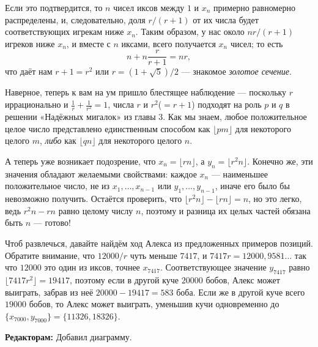 Если это подтвердится, то $n$ чисел иксов между $1$ и $x_n$ примерно равномерно распределены, и, следовательно, доля $r/(r + 1)$ от их числа будет соответствующих игрекам ниже $x_n$.
Таким образом, у нас около $nr/(r + 1)$ игреков ниже $x_n$, и вместе с $n$ иксами, всего получается $x_n$ чисел; то есть
\[n+n\frac{r}{r+1}=nr,\]
что даёт нам $r + 1 = r^2$ или $r = (1 + \sqrt{5})/2$ --- знакомое \emph{золотое сечение}.

Наверное, теперь к вам на ум пришло блестящее наблюдение --- поскольку $r$ иррационально и $\tfrac1r+\tfrac1{r^2}=1$, числа $r$ и $r^2$($= r + 1$) подходят на роль $p$ и $q$ в решении «Надёжных мигалок» из главы 3.
Как мы знаем, любое положительное целое число представлено единственным способом как $\lfloor pm\rfloor$ для некоторого целого $m$, \emph{либо} как $\lfloor qn\rfloor$ для некоторого целого $n$.

А теперь уже возникает подозрение, что $x_n=\lfloor rn\rfloor$, а $y_n=\lfloor r^2 n\rfloor$.
Конечно же, эти значения обладают желаемыми свойствами:
каждое $x_n$ --- наименьшее положительное число, не из $x_1, \dots , x_{n-1}$ или $y_1, \dots, y_{n-1}$, иначе его было бы невозможно получить.
Остаётся проверить, что $\lfloor r^2 n\rfloor - \lfloor rn\rfloor = n$, но это легко, ведь $r^2 n - rn$ равно целому числу $n$,
поэтому и разница их целых частей обязана быть $n$ --- готово!

Чтоб развлечься, давайте найдём ход Алекса из предложенных примеров позиций.
Обратите внимание, что $12 000/r$ чуть меньше $7417$, и $7417r = 12 000{,}9581\dots$ так что $12 000$ это один из иксов, точнее $x_{7417}$.
Соответствующее значение $y_{7417}$ равно $\lfloor 7417r^2\rfloor = 19 417$, поэтому если в другой куче $20 000$ бобов, Алекс может выиграть, забрав из неё $20 000 - 19 417 = 583$ боба.
Если же в другой куче всего $19 000$ бобов, то Алекс может выиграть, уменьшив кучи одновременно до $\{x_{7000}, y_{7000}\} = \{11 326, 18 326\}$.

\begin{addedbytheeditors}
\textbf{Редакторам:}
Добавил диаграмму.
\end{addedbytheeditors}

